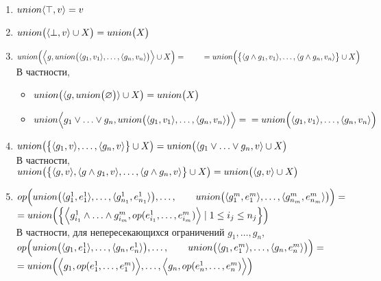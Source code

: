 \begin{prop}\label{prop:union-properties}
\begin{enumerate}[label=(\alph*)]
    \item\label{prop:union-true} $union{\langle\top, v\rangle}=v$
    \item\label{prop:union-false} $union\big(\langle\bot, v\rangle\cup X\big) = union\big(X\big)$
    \item\label{prop:union-nesting} $union\Big(\Big\langle g, union\big(\langle g_1, v_1\rangle,\ldots,\langle g_n, v_n\rangle\big)\Big\rangle\cup X\Big) =\\
    		\text{\qquad}=union\Big(\big\{\langle g \land g_1, v_1\rangle,\ldots,\langle g \land g_n, v_n\rangle\big\} \cup X\Big)$\\
    В частности,
    \begin{itemize}[label={\textbullet}]
    \item $union\big(\langle g, union\big(\varnothing\big)\rangle \cup X\big) = union\big(X\big)$
    \item $union{\Big\langle g_1\vee\ldots\vee g_n, union\big(\langle g_1, v_1\rangle,\ldots,\langle g_n, v_n\rangle\big)\Big\rangle} =\\= union\Big(\langle g_1, v_1\rangle,\ldots,\langle g_n, v_n\rangle\Big)$
    \end{itemize}
    \item\label{prop:union-disj} $union\big(\big\{\langle g_1, v\rangle,\ldots,\langle g_n, v\rangle\big\}\cup X\big) = union\big(\langle g_1 \lor \ldots \lor g_n, v\rangle \cup X\big)$ \\
    В частности, $union\big(\big\{\langle g, v\rangle, \langle g \wedge g_1, v\rangle,\ldots,\langle g \wedge g_n, v\rangle\big\}\cup X\big) = union\big(\langle g, v\rangle \cup X\big)$
    \item\label{prop:union-op} $op\Big(union\big(\langle g_1^1, e_1^1\rangle,\ldots,\langle g_{n_1}^1, e_{n_1}^1\rangle\big),\ldots,\\
    \text{\qquad}union\big(\langle g_1^m, e_1^m\rangle,\ldots,\langle g_{n_m}^m, e_{n_m}^m\rangle\big)\Big)=$\\
    \quad\mbox{$=union\Big(\Big\{\Big\langle g_{i_1}^1\wedge\ldots\wedge g_{i_m}^m, op(e_{i_1}^1,\ldots,e_{i_m}^m)\Big\rangle\mid  1 \le i_j \le n_j\Big\}\Big)$}\\
	В частности, для непересекающихся ограничений $g_1,\ldots,g_n$,\\
	$op\Big(union\big(\langle g_1, e_1^1\rangle,\ldots,\langle g_n, e_n^1\rangle\big),\ldots,\\
	\text{\qquad}union\big(\langle g_1, e_1^m\rangle,\ldots,\langle g_n, e_n^m\rangle\big)\Big)=$\\
    \quad\mbox{$=union\Big(\Big\langle g_1, op(e_1^1,\ldots,e_1^m)\Big\rangle,\ldots,\Big\langle g_n, op(e_n^1,\ldots,e_n^m)\Big\rangle\Big)$} 
\end{enumerate}
\end{prop}

